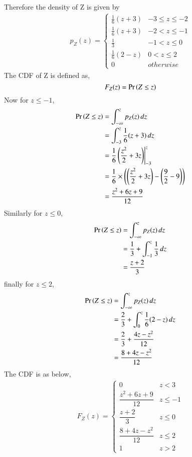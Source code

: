 \documentclass[journal,12pt,twocolumn]{IEEEtran}
\begin{document}
Therefore the density of Z is given by
\begin{align}
\label{eq:pdf_z}
p_{Z}(z)  = 
\begin{cases}
\frac{1}{6}(z+3) & -3 \le z \le -2
\\
\frac{1}{6}(z+3) & -2 < z \le -1
\\
\frac{1}{3} & -1 < z \le 0
\\
\frac{1}{6}(2-z) & 0 < z \le 2
\\
0 & otherwise
\end{cases}
\end{align}
The CDF of Z is defined as,
\begin{equation}
    F_Z(z) = \Pr\left(Z \le z\right)
\end{equation}
Now for $ z \le -1 $,
\begin{align}
    \Pr\left(Z\le z\right) &=  \int_{-\infty}^{z}p_{Z}(z) \,dz  \\
          &=  \int_{-3}^{z} \dfrac{1}{6}(z+3) \,dz  \\
          &= \dfrac{1}{6} \left(\dfrac{z^2}{2}+3z \right) \Biggr|_{-3}^{z}  \\
          &=  \dfrac{1}{6} \times \left(\left(\dfrac{z^2}{2}+3z \right) - \left(\dfrac{9}{2} -9 \right)\right) \\
          &= \dfrac{z^2+6z + 9}{12} 
\end{align}
Similarly for $z \le 0$,
\begin{align}
    \Pr\left(Z\le z\right) &=  \int_{-\infty}^{z}p_{Z}(z) \,dz  \\
          &=  \dfrac{1}{3} + \int_{-1}^{z} \dfrac{1}{3} \,dz  \\
          &= \dfrac{z+2}{3} 
\end{align}
finally for $z \le 2$,
\begin{align}
    \Pr\left(Z\le z\right) &=  \int_{-\infty}^{z}p_{Z}(z) \,dz  \\
          &= \dfrac{2}{3} + \int_{0}^{z} \dfrac{1}{6}(2-z) \,dz  \\
         & =  \dfrac{2}{3} +\dfrac{4z- z^2}{12} \\
         & = \dfrac{8 +4z -z^2}{12} 
\end{align}
The CDF is as below, 
\begin{align}
\label{eq:cdf_z}
F_{Z}(z)  = 
\begin{cases}
0 & z < 3
\\
\dfrac{z^2+6z + 9}{12} &  z \le -1
\\
\dfrac{z+2}{3} &  z \le 0
\\
\dfrac{8 +4z -z^2}{12} & z \le 2
\\
1 & z > 2
\end{cases}
\end{align}
\end{document}
